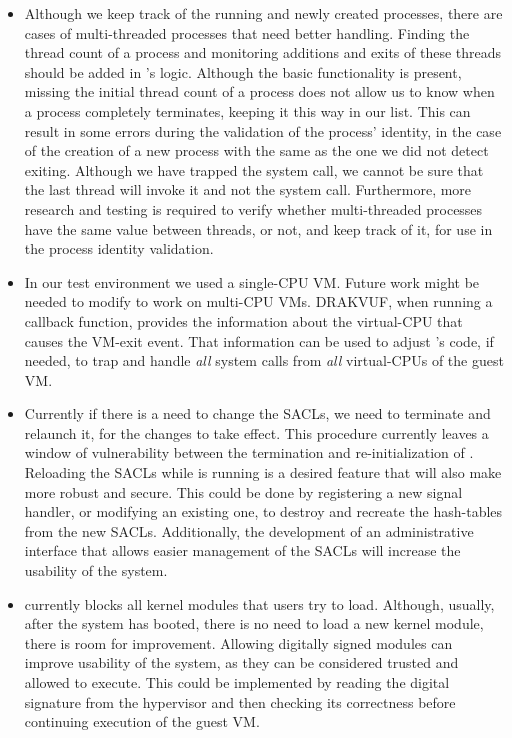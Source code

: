 \begin{itemize}

\item Although we keep track of the running and newly created processes, there are cases of multi-threaded processes that need better handling. Finding the thread count of a process and monitoring additions and exits of these threads should be added in 's logic. Although the basic functionality is present, missing the initial thread count of a process does not allow us to know when a process completely terminates, keeping it this way in our list. This can result in some errors during the validation of the process' identity, in the case of the creation of a new process with the same  as the one we did not detect exiting. Although we have trapped the  system call, we cannot be sure that the last thread will invoke it and not the  system call.
Furthermore, more research and testing is required to verify whether multi-threaded processes have the same  value between threads, or not, and keep track of it, for use in the process identity validation.


\item In our test environment we used a single-\ac{CPU} \ac{VM}. Future work might be needed to modify  to work on multi-\ac{CPU} \acp{VM}. DRAKVUF, when running a callback function, provides the information about the virtual-\ac{CPU} that causes the \ac{VM}-exit event. That information can be used to adjust 's code, if needed, to trap and handle \emph{all} system calls from \emph{all} virtual-\acp{CPU} of the guest \ac{VM}.

\item Currently if there is a need to change the \acp{SACL}, we need to terminate  and relaunch it, for the changes to take effect. This procedure currently leaves a window of vulnerability between the termination and re-initialization of . Reloading the \acp{SACL} while  is running is a desired feature that will also make  more robust and secure. This could be done by registering a new signal handler, or modifying an existing one, to destroy and recreate the hash-tables from the new \acp{SACL}. Additionally, the development of an administrative interface that allows easier management of the \acp{SACL} will increase the usability of the system.

\item {} currently blocks all kernel modules that users try to load. Although, usually, after the system has booted, there is no need to load a new kernel module, there is room for improvement. Allowing digitally signed modules can improve usability of the system, as they can be considered trusted and allowed to execute. This could be implemented by reading the digital signature from the hypervisor and then checking its correctness before continuing execution of the guest \ac{VM}.


\end{itemize}

